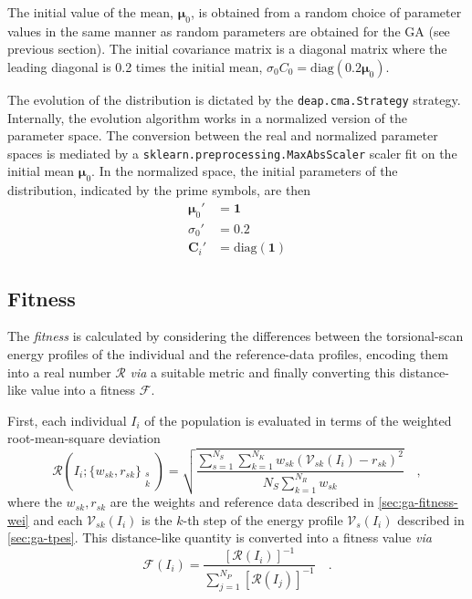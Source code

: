 \documentclass[10pt,a4paper,openany]{memoir}
\numberwithin{equation}{section}
\begin{document}
The initial value of the mean, $\boldsymbol{\mu}_0$,
is obtained from a random choice of parameter values in the same
manner as random parameters are obtained for the GA (see previous
section). The initial covariance matrix is a diagonal matrix where the
leading diagonal is 0.2 times the initial mean,
$\sigma_0 C_0 = \text{diag} (0.2\boldsymbol{\mu}_0)$.

The evolution of the distribution is dictated by the
\texttt{deap.cma.Strategy} strategy.  Internally, the evolution
algorithm works in a normalized version of the parameter space. The
conversion between the real and normalized parameter spaces is
mediated by a \texttt{sklearn.preprocessing.MaxAbsScaler} scaler fit
on the initial mean $\boldsymbol{\mu}_0$. In the normalized space, the
initial parameters of the distribution, indicated by the prime
symbols, are then
\begin{align*}
  \boldsymbol{\mu}_0' & = \mathbf{1} \\
  \sigma_0' & = 0.2 \\
  \boldsymbol{C}_i' & = \text{diag} (\mathbf{1}) 
\end{align*}

\subsection{Fitness}
\label{sec:ga-fitness}

The \textit{fitness} is calculated by considering the differences
between the torsional-scan energy profiles of the individual and the
reference-data profiles, encoding them into a real number
$\mathcal{R}$ \textit{via} a suitable metric and finally converting
this distance-like value into a fitness $\mathcal{F}$.

First, each individual $I_i$ of the population is evaluated in terms
of the weighted root-mean-square deviation
\begin{equation}
  \label{eq:ga-fitness-rmsd}
  \mathcal{R}\left(I_i;\{w_{sk},r_{sk}\}_{\substack{s\\k}} \right) = \sqrt{\frac{\sum_{s=1}^{N_S} \sum_{k=1}^{N_K} w_{sk}(\mathcal{V}_{sk}(I_i)-r_{sk})^2}{N_S \sum_{k=1}^{N_R} w_{sk}}} \quad ,
\end{equation}
where the $w_{sk},r_{sk}$ are the weights and reference data described in \autoref{sec:ga-fitness-wei}
and each $\mathcal{V}_{sk}(I_i)$ is the $k$-th step of the energy profile $\mathcal{V}_s(I_i)$ described in \autoref{sec:ga-tpes}.
This distance-like quantity is converted into a fitness value \textit{via}
\begin{equation}
  \label{eq:ga-fitness}
  \mathcal{F}(I_i) =\frac{\left[\mathcal{R}(I_i)\right]^{-1}}{\sum_{j=1}^{N_P} \left[\mathcal{R}(I_j)\right]^{-1}} \quad .
\end{equation}
\end{document}
